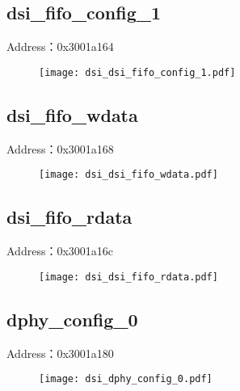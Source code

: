 \subsection{dsi\_fifo\_config\_1}
\label{dsi-dsi-fifo-config-1}
Address：0x3001a164
 \begin{figure}[H]
\texttt{[image: dsi\_dsi\_fifo\_config\_1.pdf]}
\end{figure}

\subsection{dsi\_fifo\_wdata}
\label{dsi-dsi-fifo-wdata}
Address：0x3001a168
 \begin{figure}[H]
\texttt{[image: dsi\_dsi\_fifo\_wdata.pdf]}
\end{figure}

\subsection{dsi\_fifo\_rdata}
\label{dsi-dsi-fifo-rdata}
Address：0x3001a16c
 \begin{figure}[H]
\texttt{[image: dsi\_dsi\_fifo\_rdata.pdf]}
\end{figure}

\subsection{dphy\_config\_0}
\label{dsi-dphy-config-0}
Address：0x3001a180
 \begin{figure}[H]
\texttt{[image: dsi\_dphy\_config\_0.pdf]}
\end{figure}

